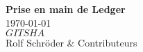 
\begin{titlepage}
\vspace*{10 mm} %
\begin{center}
{\Huge\bfseries Prise en main de Ledger}\\
\vspace{50mm}
\today \leavevmode \\
$GITSHA$ \\
\vspace{\fill}
Rolf Schr\"oder \& Contributeurs
\end{center}
\end{titlepage}
